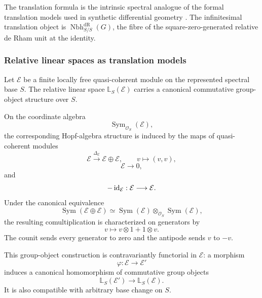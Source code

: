 \begin{remark}
The translation formula is the intrinsic spectral analogue of the formal
translation models used in synthetic differential geometry
\cite{Kock1980,KhavkineSchreiber2017}. The infinitesimal translation object is
\(\operatorname{Nbh}^{\mathrm{dR}}_{S/S}(G)\), the fibre of the
square-zero-generated relative de Rham unit at the identity.
\end{remark}

\subsubsection{Relative linear spaces as translation models}
\label{subsec:relative-linear-translation}

\begin{proposition}
\label{prop:linear-space-additive-group}
Let \(\mathcal E\) be a finite locally free quasi-coherent module on the represented
spectral base \(S\). The relative linear space \(\mathbb L_S(\mathcal E)\) carries a canonical
commutative group-object structure over \(S\).

On the coordinate algebra
\[
  \operatorname{Sym}_{\mathcal O_S}(\mathcal E),
\]
the corresponding Hopf-algebra structure is induced by the maps of
quasi-coherent modules
\[
  \mathcal E\xrightarrow{\Delta_{\mathcal E}}\mathcal E\oplus \mathcal E,
  \qquad
  v\longmapsto(v,v),
\]
\[
  \mathcal E\longrightarrow0,
\]
and
\[
  -\operatorname{id}_{\mathcal E}:\mathcal E\longrightarrow \mathcal E.
\]
Under the canonical equivalence
\[
  \operatorname{Sym}(\mathcal E\oplus \mathcal E)
  \simeq
  \operatorname{Sym}(\mathcal E)\otimes_{\mathcal O_S}\operatorname{Sym}(\mathcal E),
\]
the resulting comultiplication is characterized on generators by
\[
  v\longmapsto v\otimes1+1\otimes v.
\]
The counit sends every generator to zero and the antipode sends \(v\) to
\(-v\).

This group-object construction is contravariantly functorial in \(\mathcal E\): a
morphism
\[
  \varphi:\mathcal E\to \mathcal E'
\]
induces a canonical homomorphism of commutative group objects
\[
  \mathbb L_S(\mathcal E')
  \longrightarrow
  \mathbb L_S(\mathcal E).
\]
It is also compatible with arbitrary base change on \(S\).
\end{proposition}

